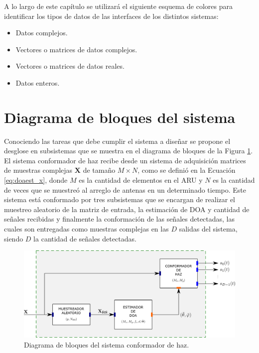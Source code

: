 A lo largo de este capítulo se utilizará el siguiente esquema de colores para identificar los tipos de datos de las interfaces de los distintos sistemas:
\begin{itemize}
    \item {}\quad Datos complejos.
    \item {}\quad Vectores o matrices de datos complejos.
    \item {}\quad Vectores o matrices de datos reales.
    \item {}\quad Datos enteros.
\end{itemize}

\section{Diagrama de bloques del sistema}\label{subc:sistema_bloques}

Conociendo las tareas que debe cumplir el sistema a diseñar se propone el desglose en subsistemas que se muestra en el diagrama de bloques de la Figura \ref{fig:sistema_bd}. El sistema conformador de haz recibe desde un sistema de adquisición matrices de muestras complejas $\mathbf{X}$ de tamaño $M\times N$, como se definió en la Ecuación \ref{eq:doaest_x}, donde $M$ es la cantidad de elementos en el ARU y $N$ es la cantidad de veces que se muestreó al arreglo de antenas en un determinado tiempo. Este sistema está conformado por tres subsistemas que se encargan de realizar el muestreo aleatorio de la matriz de entrada, la estimación de DOA y cantidad de señales recibidas y finalmente la conformación de las señales detectadas, las cuales son entregadas como muestras complejas en las $D$ salidas del sistema, siendo $D$ la cantidad de señales detectadas.

\begin{figure}[ht!]
    \centering
    \includegraphics[width=0.9\linewidth]{images/06-Sistema/sistema_bd.png}
    \caption{Diagrama de bloques del sistema conformador de haz.}
    \label{fig:sistema_bd}
\end{figure}

